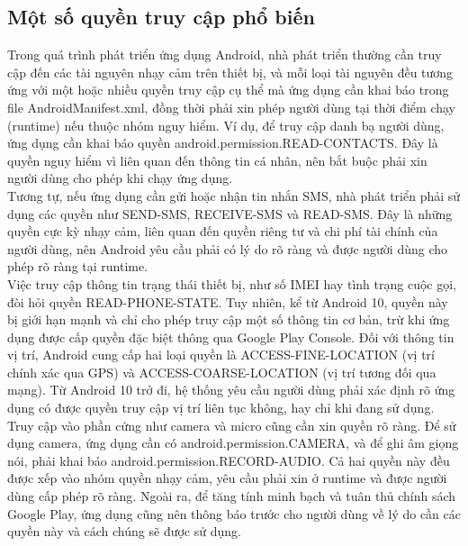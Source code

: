 \subsection{Một số quyền truy cập phổ biến}
    \begin{flushleft}
        \hspace*{0.8cm}Trong quá trình phát triển ứng dụng Android, nhà phát triển thường cần truy cập đến các tài nguyên nhạy cảm trên thiết bị, và mỗi loại tài nguyên đều tương ứng với một hoặc nhiều quyền truy cập cụ thể mà ứng dụng cần khai báo trong file AndroidManifest.xml, đồng thời phải xin phép người dùng tại thời điểm chạy (runtime) nếu thuộc nhóm nguy hiểm. Ví dụ, để truy cập danh bạ người dùng, ứng dụng cần khai báo quyền android.permission.READ-CONTACTS. Đây là quyền nguy hiểm vì liên quan đến thông tin cá nhân, nên bắt buộc phải xin người dùng cho phép khi chạy ứng dụng.\\
        \hspace*{0.8cm}Tương tự, nếu ứng dụng cần gửi hoặc nhận tin nhắn SMS, nhà phát triển phải sử dụng các quyền như SEND-SMS, RECEIVE-SMS và READ-SMS. Đây là những quyền cực kỳ nhạy cảm, liên quan đến quyền riêng tư và chi phí tài chính của người dùng, nên Android yêu cầu phải có lý do rõ ràng và được người dùng cho phép rõ ràng tại runtime.\\
        \hspace*{0.8cm}Việc truy cập thông tin trạng thái thiết bị, như số IMEI hay tình trạng cuộc gọi, đòi hỏi quyền READ-PHONE-STATE. Tuy nhiên, kể từ Android 10, quyền này bị giới hạn mạnh và chỉ cho phép truy cập một số thông tin cơ bản, trừ khi ứng dụng được cấp quyền đặc biệt thông qua Google Play Console. Đối với thông tin vị trí, Android cung cấp hai loại quyền là ACCESS-FINE-LOCATION (vị trí chính xác qua GPS) và ACCESS-COARSE-LOCATION (vị trí tương đối qua mạng). Từ Android 10 trở đi, hệ thống yêu cầu người dùng phải xác định rõ ứng dụng có được quyền truy cập vị trí liên tục không, hay chỉ khi đang sử dụng.\\
        \hspace*{0.8cm}Truy cập vào phần cứng như camera và micro cũng cần xin quyền rõ ràng. Để sử dụng camera, ứng dụng cần có android.permission.CAMERA, và để ghi âm giọng nói, phải khai báo android.permission.RECORD-AUDIO. Cả hai quyền này đều được xếp vào nhóm quyền nhạy cảm, yêu cầu phải xin ở runtime và được người dùng cấp phép rõ ràng. Ngoài ra, để tăng tính minh bạch và tuân thủ chính sách Google Play, ứng dụng cũng nên thông báo trước cho người dùng về lý do cần các quyền này và cách chúng sẽ được sử dụng.
    \end{flushleft} 

